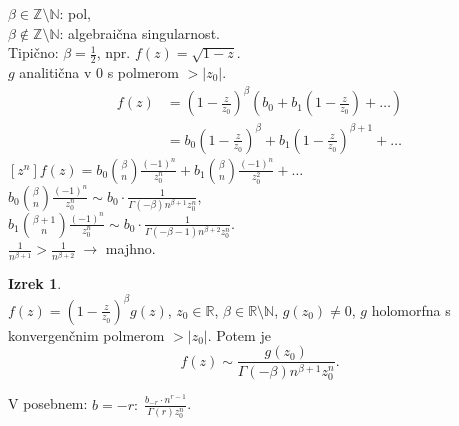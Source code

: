 \documentclass[a4paper, 12pt]{book}
\theoremstyle{definition}
\newtheorem{theorem}[counter]{Izrek}
\theoremstyle{remark}
\newcommand{\N}{\mathbb{N}}
\newcommand{\Z}{\mathbb{Z}}
\newcommand{\R}{\mathbb{R}}
\begin{document}
$\beta \in \Z \setminus \N$: pol, \\
$\beta \notin \Z \setminus \N$: algebraična singularnost. \\
Tipično: $\beta = \frac{1}{2}$, npr. $f(z) = \sqrt{1-z}$. \\
$g$ analitična v $0$ s polmerom $> |z_0|$. \\
\begin{align*}
  f(z) &= \left(1 - \frac{z}{z_0}\right)^{\beta}
    \left(b_0 + b_1 \left(1 - \frac{z}{z_0}\right) + \dots\right) \\
  &= b_0 \left(1 - \frac{z}{z_0}\right)^{\beta} + b_1 \left(1 - \frac{z}{z_0}\right)^{\beta+1} + \dots
\end{align*}
$[z^n] f(z) = b_0 \binom{\beta}{n} \frac{(-1)^n}{z_0^n} + b_1 \binom{\beta}{n} \frac{(-1)^n}{z_0^2} + \dots$ \\
$b_0 \binom{\beta}{n} \frac{(-1)^n}{z_0^n} \sim b_0 \cdot \frac{1}{\Gamma(-\beta) n^{\beta+1} z_0^n}$, \\
$b_1 \binom{\beta+1}{n} \frac{(-1)^n}{z_0^n} \sim b_0 \cdot \frac{1}{\Gamma(-\beta-1) n^{\beta+2} z_0^n}$. \\
$\frac{1}{n^{\beta+1}} > \frac{1}{n^{\beta+2}} \; \to$ majhno.
\begin{theorem} \text{} \\
  $f(z) = \left(1 - \frac{z}{z_0}\right)^{\beta} g(z)$, $z_0 \in \R$, $\beta \in \R \setminus \N$,
  $g(z_0) \neq 0$, $g$ holomorfna s konvergenčnim polmerom $> |z_0|$.
  Potem je
  \begin{equation*}
    [z^n] f(z) \sim \frac{g(z_0)}{\Gamma(-\beta) n^{\beta+1} z_0^n}.
  \end{equation*}
\end{theorem}
V posebnem: $b = -r: \; \frac{b_{-r} \cdot n^{r-1}}{\Gamma(r) z_0^n}$.
\end{document}
